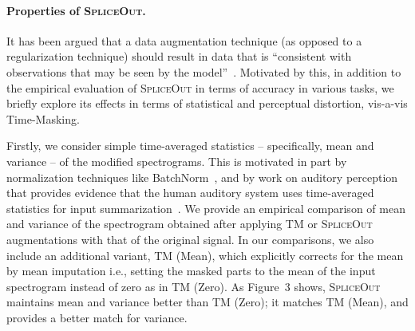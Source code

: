 \documentclass{article}
\newcommand{\SpA}{{\textsc{SpliceOut}}\xspace}
\begin{document}
\paragraph*{Properties of \SpA.}
It has been argued that a data augmentation technique (as opposed to a regularization technique) should result in data that is ``consistent with observations that may be seen by the model''~\citep{wang2020improving}. Motivated by this, in addition to the empirical evaluation of \SpA in terms of accuracy in various tasks, we briefly explore its effects in terms of statistical and perceptual distortion, vis-a-vis Time-Masking.

Firstly, we consider simple time-averaged statistics -- specifically, mean and variance -- of the modified spectrograms.
This is motivated in part by normalization techniques like BatchNorm~\citep{batchnorm}, and by work on auditory perception that provides evidence that the human auditory system uses time-averaged statistics for input summarization~\citep{summary1,summary2}.
We provide an empirical comparison of mean and variance of the spectrogram obtained after applying TM or \SpA augmentations with that of the original signal. In our comparisons, we also include an additional variant, TM (Mean), which explicitly corrects for the mean by mean imputation i.e., setting the masked parts to the mean of the input spectrogram instead of zero as in TM (Zero). As Figure~3 shows, \SpA maintains mean and variance better than TM (Zero); it matches TM (Mean), and provides a better match for variance.
\end{document}
